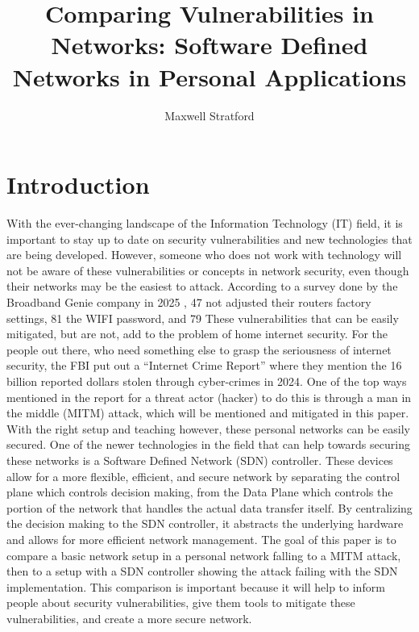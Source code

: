 \documentclass[12pt]{article}
\title{\textbf{Comparing Vulnerabilities in Networks: 
Software Defined Networks in Personal Applications}}
\author{Maxwell Stratford}
\begin{document}
\maketitle

\section{Introduction}
With the ever-changing landscape of the Information Technology (IT) field, it is important to stay up to date 
on security vulnerabilities and new technologies that are being developed. However, someone who does not work 
with technology will not be aware of these vulnerabilities or concepts in network security, even though their 
networks may be the easiest to attack. 
According to a survey done by the Broadband Genie company in 2025 \cite{broadband_genie_2026}, 47%
not adjusted their routers factory settings, 81%
the WIFI password, and 79%
 These vulnerabilities that can be easily mitigated, but are not, add to the problem of home internet security. 
 For the people out there, who need something else to grasp the seriousness of internet security, the FBI put 
 out a “Internet Crime Report” \cite{fbi_ic3_2024} where they mention the 16 billion reported dollars stolen through 
 cyber-crimes in 2024. One of the top ways mentioned in the report for a threat actor (hacker) to do this is 
 through a man in the middle (MITM) attack, which will be mentioned and mitigated in this paper.
With the right setup and teaching however, these personal networks can be easily secured. One of the newer 
technologies in the field that can help towards securing these networks is a Software Defined Network (SDN) 
controller. These devices allow for a more flexible, efficient, and secure network by separating the control 
plane which controls decision making, from the Data Plane which controls the portion of the network that 
handles the actual data transfer itself.
By centralizing the decision making to the SDN controller, it abstracts the underlying hardware and allows 
for more efficient network management. The goal of this paper is to compare a basic network setup in a 
personal network falling to a MITM attack, then to a setup with a SDN controller showing the attack failing 
with the SDN implementation. This comparison is important because it will help to inform people about 
security vulnerabilities, give them tools to mitigate these vulnerabilities, and create a more secure network. 
\end{document}
